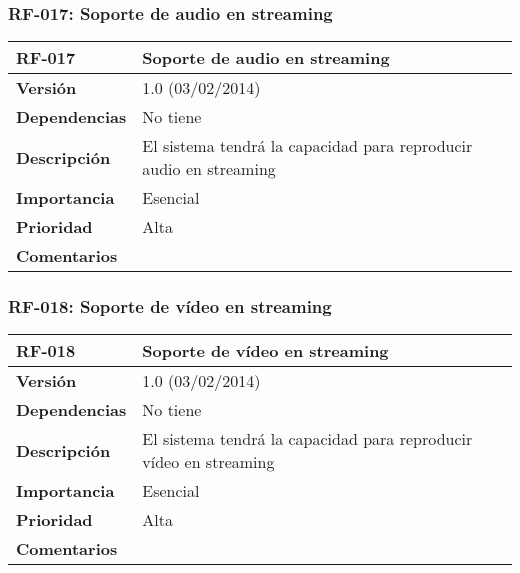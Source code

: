 \subsubsection*{RF-017: Soporte de audio en streaming}
\begin{tabular}{|p{3cm}|p{11.5cm}|}
\hline
\textbf{RF-017}         & \textbf{Soporte de audio en streaming}                                                                     \\ \hline
\textbf{Versión}        & 1.0 (03/02/2014)                                                                                           \\ \hline
\textbf{Dependencias}   & No tiene                                                                                                   \\ \hline
\textbf{Descripción}    & El sistema tendrá la capacidad para reproducir audio en streaming                                          \\ \hline
\textbf{Importancia}    & Esencial                                                                                                   \\ \hline
\textbf{Prioridad}      & Alta                                                                                                       \\ \hline
\textbf{Comentarios}    &                                                                                                            \\ \hline
\end{tabular}

\subsubsection*{RF-018: Soporte de vídeo en streaming}
\begin{tabular}{|p{3cm}|p{11.5cm}|}
\hline
\textbf{RF-018}         & \textbf{Soporte de vídeo en streaming}                                                                     \\ \hline
\textbf{Versión}        & 1.0 (03/02/2014)                                                                                           \\ \hline
\textbf{Dependencias}   & No tiene                                                                                                   \\ \hline
\textbf{Descripción}    & El sistema tendrá la capacidad para reproducir vídeo en streaming                                          \\ \hline
\textbf{Importancia}    & Esencial                                                                                                   \\ \hline
\textbf{Prioridad}      & Alta                                                                                                       \\ \hline
\textbf{Comentarios}    &                                                                                                            \\ \hline
\end{tabular}

